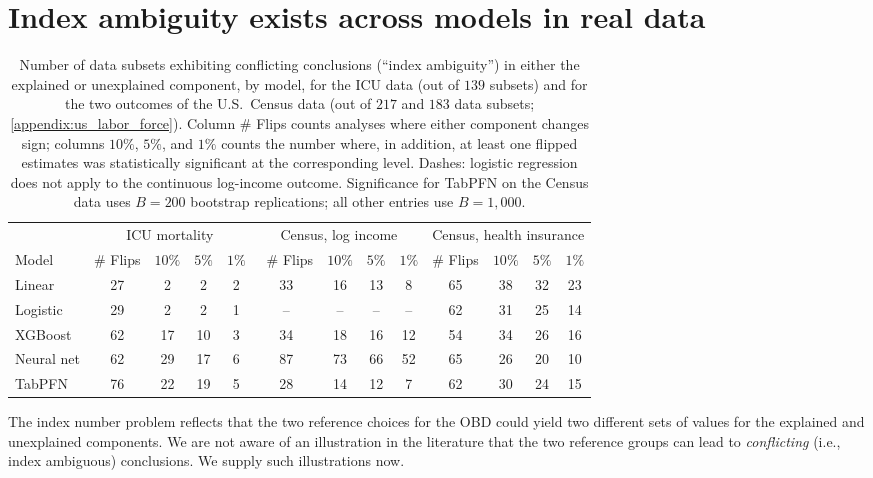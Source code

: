 \section{Index ambiguity exists across models in real data}
\label{sec:real_example}

\begin{table}[t]
    \caption{Number of data subsets exhibiting conflicting conclusions (``index ambiguity'') in either the explained or unexplained component, by model, for the ICU data (out of $139$ subsets) and for the two outcomes of the U.S.\ Census data (out of $217$ and $183$ data subsets; \cref{appendix:us_labor_force}). Column \# Flips counts analyses where either component changes sign; columns $10\%$, $5\%$, and $1\%$ counts the number where, in addition, at least one flipped estimates was statistically significant at the corresponding level. Dashes: logistic regression does not apply to the continuous log-income outcome. Significance for TabPFN on the Census data uses $B = 200$ bootstrap replications; all other entries use $B = 1{,}000$.}
    \label{tab:flip_summary_main}
    \centering
    \small
    \begin{tabular}{l cccc cccc cccc}
    \toprule
     & \multicolumn{4}{c}{ICU mortality} & \multicolumn{4}{c}{Census, log income} & \multicolumn{4}{c}{Census, health insurance} \\
    \cmidrule(lr){2-5} \cmidrule(lr){6-9} \cmidrule(lr){10-13}
    Model & \# Flips & $10\%$ & $5\%$ & $1\%$ &\ \# Flips & $10\%$ & $5\%$ & $1\%$ & \# Flips & $10\%$ & $5\%$ & $1\%$ \\
    \midrule
    Linear      & 27 &  2 &  2 &  2 & 33 & 16 & 13 & 8  & 65 & 38 & 32 & 23 \\
    Logistic    & 29 &  2 &  2 &  1 & -- & -- & -- & -- & 62 & 31 & 25 & 14 \\
    XGBoost     & 62 & 17 & 10 &  3 & 34 & 18 & 16 & 12 & 54 & 34 & 26 & 16 \\
    Neural net  & 62 & 29 & 17 &  6 & 87 & 73 & 66 & 52 & 65 & 26 & 20 & 10 \\
    TabPFN      & 76 & 22 & 19 &  5 & 28 & 14 & 12 & 7 & 62 & 30 & 24 & 15 \\
    \bottomrule
    \end{tabular}
\end{table}

The index number problem reflects that the two reference choices for the OBD could yield two different sets of values for the explained and unexplained components. We are not aware of an illustration in the literature that the two reference groups can lead to \emph{conflicting} (i.e., index ambiguous) conclusions. We supply such illustrations now. %

